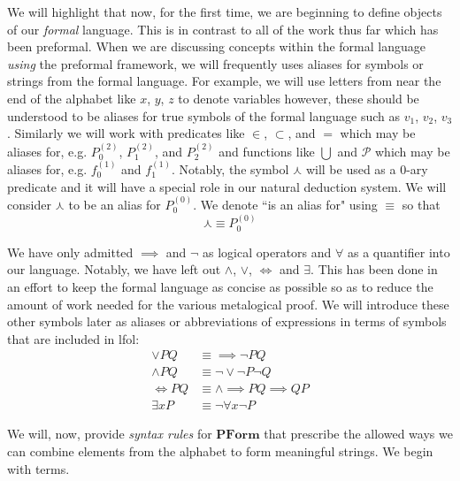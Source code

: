 \documentclass[oneside, 12pt]{book}
\theoremstyle{break}
\newtheorem{preformal definition}[definition]{Preformal Definition}
\newtheorem{preformal theorem}[theorem]{Preformal Theorem}
\newcommand{\mc}[1]{\mathcal{#1}}
\newcommand{\qq}[1]{``#1"}
\begin{document}
		We will highlight that now, for the first time, we are beginning to define objects of our \textit{formal} language.
		This is in contrast to all of the work thus far which has been preformal.
		When we are discussing concepts within the formal language \textit{using} the preformal framework, we will frequently uses aliases for symbols or strings from the formal language.
		For example, we will use letters from near the end of the alphabet like $x$, $y$, $z$ to denote variables however, these should be understood to be aliases for true symbols of the formal language such as $v_1$, $v_2$, $v_3$.
		Similarly we will work with predicates like $\in$, $\subset$, and $=$ which may be aliases for, e.g. $P^{(2)}_0$, $P^{(2)}_1$, and $P^{(2)}_2$ and functions like $\bigcup$ and $\mc{P}$ which may be aliases for, e.g. $f^{(1)}_0$ and $f^{(1)}_1$.
		Notably, the symbol $\curlywedge$ will be used as a $0$-ary predicate and it will have a special role in our natural deduction system.
		We will consider $\curlywedge$ to be an alias for $P_0^{(0)}$.
		We denote \qq{is an alias for} using $\equiv$ so that
		\begin{equation*}
			\curlywedge \equiv P_0^{(0)}
		\end{equation*}
		
		We have only admitted $\implies$ and $\lnot$ as logical operators and $\forall$ as a quantifier into our language. 
		Notably, we have left out $\land$, $\lor$, $\iff$ and $\exists$.
		This has been done in an effort to keep the formal language as concise as possible so as to reduce the amount of work needed for the various metalogical proof. 
		We will introduce these other symbols later as aliases or abbreviations of expressions in terms of symbols that are included in \gls{lfol}:
		\begin{align*}
			\lor PQ &\equiv \implies \lnot P Q\\			
			\land PQ &\equiv \lnot \lor \lnot P \lnot Q\\
			\iff PQ &\equiv \land\implies PQ \implies QP\\
			\exists x P &\equiv \lnot \forall x \lnot P
		\end{align*}

		We will, now, provide \textit{syntax rules} for $\textbf{PForm}$ that prescribe the allowed ways we can combine elements from the alphabet to form meaningful strings.
		We begin with terms.		
		
\end{document}
